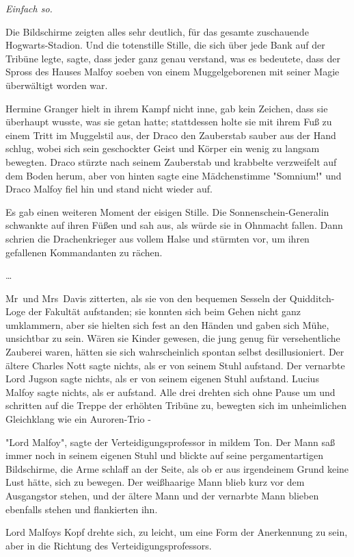 {\emph{Einfach so.}

Die Bildschirme zeigten alles sehr deutlich, für das gesamte zuschauende Hogwarts-Stadion. Und die totenstille Stille, die sich über jede Bank auf der Tribüne legte, sagte, dass jeder ganz genau verstand, was es bedeutete, dass der Spross des Hauses Malfoy soeben von einem Muggelgeborenen mit seiner Magie überwältigt worden war.

Hermine Granger hielt in ihrem Kampf nicht inne, gab kein Zeichen, dass sie überhaupt wusste, was sie getan hatte; stattdessen holte sie mit ihrem Fuß zu einem Tritt im Muggelstil aus, der Draco den Zauberstab sauber aus der Hand schlug, wobei sich sein geschockter Geist und Körper ein wenig zu langsam bewegten. Draco stürzte nach seinem Zauberstab und krabbelte verzweifelt auf dem Boden herum, aber von hinten sagte eine Mädchenstimme "Somnium!" und Draco Malfoy fiel hin und stand nicht wieder auf.

Es gab einen weiteren Moment der eisigen Stille. Die Sonnenschein-Generalin schwankte auf ihren Füßen und sah aus, als würde sie in Ohnmacht fallen. Dann schrien die Drachenkrieger aus vollem Halse und stürmten vor, um ihren gefallenen Kommandanten zu rächen.

…

Mr~und Mrs~Davis zitterten, als sie von den bequemen Sesseln der Quidditch-Loge der Fakultät aufstanden; sie konnten sich beim Gehen nicht ganz umklammern, aber sie hielten sich fest an den Händen und gaben sich Mühe, unsichtbar zu sein. Wären sie Kinder gewesen, die jung genug für versehentliche Zauberei waren, hätten sie sich wahrscheinlich spontan selbst desillusioniert. Der ältere Charles Nott sagte nichts, als er von seinem Stuhl aufstand. Der vernarbte Lord Jugson sagte nichts, als er von seinem eigenen Stuhl aufstand. Lucius Malfoy sagte nichts, als er aufstand. Alle drei drehten sich ohne Pause um und schritten auf die Treppe der erhöhten Tribüne zu, bewegten sich im unheimlichen Gleichklang wie ein Auroren-Trio -

"Lord Malfoy", sagte der Verteidigungsprofessor in mildem Ton. Der Mann saß immer noch in seinem eigenen Stuhl und blickte auf seine pergamentartigen Bildschirme, die Arme schlaff an der Seite, als ob er aus irgendeinem Grund keine Lust hätte, sich zu bewegen. Der weißhaarige Mann blieb kurz vor dem Ausgangstor stehen, und der ältere Mann und der vernarbte Mann blieben ebenfalls stehen und flankierten ihn.

Lord Malfoys Kopf drehte sich, zu leicht, um eine Form der Anerkennung zu sein, aber in die Richtung des Verteidigungsprofessors.

}
